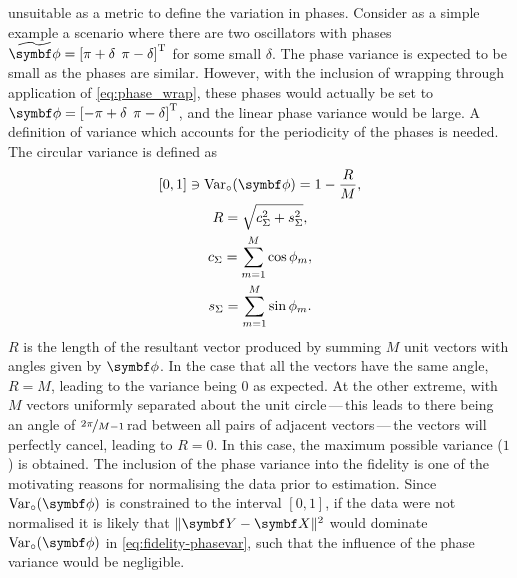 unsuitable as a metric to define the variation in phases. Consider as a simple
example a scenario
where there are two oscillators with phases $\widetilde{\bdphi} = \left[ \pi +
\delta\:\:\pi - \delta \right]\T$ for some small $\delta$.
The phase variance is expected to be small as the phases are similar.
However, with the inclusion of wrapping through application of
\cref{eq:phase_wrap}, these phases would actually be set to $\bdphi = \left[
    -\pi
+ \delta\:\:\pi - \delta \right]\T$, and the linear phase
variance would be large. A definition of variance which accounts for the
periodicity of the phases is needed. The circular variance is defined
as\cite[Chapter 3]{Fisher1993}
\begin{subequations}
    \begin{gather}
        [0, 1] \ni \circvar = 1 - \frac{R}{M},\\
        R = \sqrt{c_{\Sigma}^2 + s_{\Sigma}^2}, \\
        c_{\Sigma} = \sum_{m=1}^M \cos \phi_m, \\
        s_{\Sigma} = \sum_{m=1}^M \sin \phi_m.
    \end{gather}
\end{subequations}
$R$ is the length of the resultant vector produced by summing $M$ unit vectors
with angles given by $\bdphi$. In the case that all the vectors have the
same angle, $R=M$, leading to the variance being $0$ as expected. At the other
extreme, with $M$ vectors uniformly separated about the unit circle\,---\,this leads to there being an angle of $\nicefrac{2 \pi}{M - 1}$\,\unit{\radian} between all
pairs of adjacent vectors\,---\,the
vectors will perfectly cancel, leading to $R=0$. In this case, the maximum
possible variance ($1$) is obtained.
The inclusion of the phase variance into the fidelity is one of the
motivating reasons for normalising the data prior to estimation. Since
$\circvar$ is constrained to the interval $[0, 1]$, if the data were not
normalised it is likely that $\lVert \bY - \bX \rVert^2$ would dominate
$\circvar$ in \cref{eq:fidelity-phasevar}, such that the influence of the phase
variance would be negligible.

